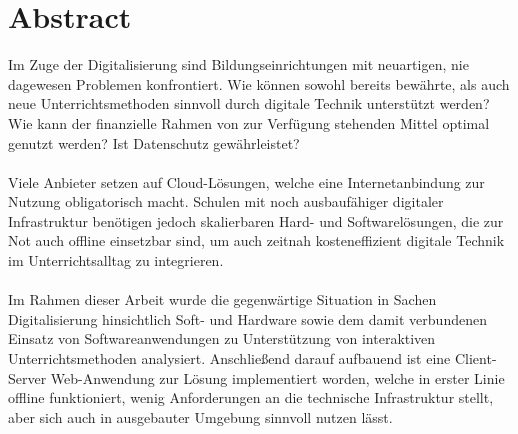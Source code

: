 \section*{Abstract}\label{sec:abstract}
Im Zuge der Digitalisierung sind Bildungseinrichtungen mit  
neuartigen, nie dagewesen Problemen konfrontiert. 
Wie können sowohl bereits bewährte, als auch neue Unterrichtsmethoden sinnvoll durch digitale
Technik unterstützt werden? Wie kann der finanzielle Rahmen von zur Verfügung stehenden
Mittel optimal genutzt werden? Ist Datenschutz gewährleistet? 
\\ \\
Viele Anbieter setzen auf Cloud-Lösungen, welche eine Internetanbindung zur Nutzung obligatorisch macht. Schulen mit noch ausbaufähiger digitaler Infrastruktur 
benötigen jedoch skalierbaren Hard- und Softwarelösungen, die zur Not auch offline einsetzbar sind, um auch zeitnah kosteneffizient digitale Technik im Unterrichtsalltag zu integrieren.
\\ \\  
Im Rahmen dieser Arbeit wurde die gegenwärtige Situation in Sachen Digitalisierung hinsichtlich Soft- und Hardware sowie dem damit verbundenen Einsatz von Softwareanwendungen zu Unterstützung von interaktiven Unterrichtsmethoden analysiert. Anschließend darauf aufbauend ist eine Client-Server Web-Anwendung zur Lösung implementiert worden, welche in erster Linie offline funktioniert, wenig Anforderungen an die technische Infrastruktur stellt, aber sich auch in ausgebauter Umgebung sinnvoll nutzen lässt. 